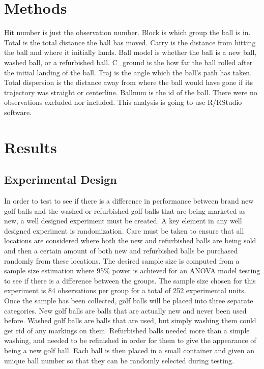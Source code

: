 \documentclass{article}\usepackage[]{graphicx}\usepackage[]{color}
\begin{document}
\section*{Methods}

Hit number is just the observation number. Block is which group the ball is in. Total is the total distance the ball has moved. Carry is the distance from hitting the ball and where it initially lands. Ball model is whether the ball is a new ball, washed ball, or a refurbished ball. C\_ground is the how far the ball rolled after the initial landing of the ball. Traj is the angle which the ball's path has taken. Total dispersion is the distance away from where the ball would have gone if its trajectory was straight or centerline. Ballnum is the id of the ball. 
There were no observations excluded nor included. This analysis is going to use R/RStudio software.

\section*{Results}
\subsection*{Experimental Design}

In order to test to see if there is a difference in performance between brand new golf balls and the washed or refurbished golf balls that are being marketed as new, a well designed experiment must be created. A key element in any well designed experiment is randomization. Care must be taken to ensure that all locations are considered where both the new and refurbished balls are being sold and then a certain amount of both new and refurbished balls be purchased randomly from these locations. The desired sample size is computed from a sample size estimation where 95\% power is achieved for an ANOVA model testing to see if there is a difference between the groups. The sample size chosen for this experiment is 84 observations per group for a total of 252 experimental units. Once the sample has been collected, golf balls will be placed into three separate categories. New golf balls are balls that are actually new and never been used before. Washed golf balls are balls that are used, but simply washing them could get rid of any markings on them. Refurbished balls needed more than a simple washing, and needed to be refinished in order for them to give the appearance of being a new golf ball. Each ball is then placed in a small container and given an unique ball number so that they can be randomly selected during testing.
\end{document}
